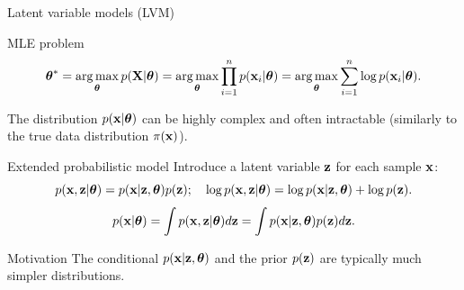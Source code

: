 \documentclass{beamer}
\begin{document}
\begin{frame}{Latent variable models (LVM)}
	\begin{block}{MLE problem}
		\vspace{-0.5cm}
		\[
		\boldsymbol{\theta}^* = \operatorname*{arg\,max}_{\boldsymbol{\theta}} p(\mathbf{X} | \boldsymbol{\theta}) = \operatorname*{arg\,max}_{\boldsymbol{\theta}} \prod_{i=1}^n p(\mathbf{x}_i | \boldsymbol{\theta}) = \operatorname*{arg\,max}_{\boldsymbol{\theta}} \sum_{i=1}^n \log p(\mathbf{x}_i | \boldsymbol{\theta}).
		\]
		\vspace{-0.5cm}
	\end{block}
	The distribution $p(\mathbf{x} | \boldsymbol{\theta})$ can be highly complex and often intractable (similarly to the true data distribution $\pi(\mathbf{x})$).
	\begin{block}{Extended probabilistic model}
		Introduce a latent variable $\mathbf{z}$ for each sample $\mathbf{x}$:
		\[
		p(\mathbf{x}, \mathbf{z} | \boldsymbol{\theta}) = p(\mathbf{x} | \mathbf{z}, \boldsymbol{\theta}) p(\mathbf{z}); \quad 
		\log p(\mathbf{x}, \mathbf{z} | \boldsymbol{\theta}) = \log p(\mathbf{x} | \mathbf{z}, \boldsymbol{\theta}) + \log p(\mathbf{z}).
		\]
		\[
		p(\mathbf{x} | \boldsymbol{\theta}) = \int p(\mathbf{x}, \mathbf{z} | \boldsymbol{\theta}) d\mathbf{z} = \int p(\mathbf{x} | \mathbf{z}, \boldsymbol{\theta}) p(\mathbf{z}) d\mathbf{z}.
		\]
	\end{block}
	\vspace{-0.3cm}
	\begin{block}{Motivation}
		The conditional $p(\mathbf{x} | \mathbf{z}, \boldsymbol{\theta})$ and the prior $p(\mathbf{z})$ are typically much simpler distributions.
	\end{block}
\end{frame}
\end{document}
